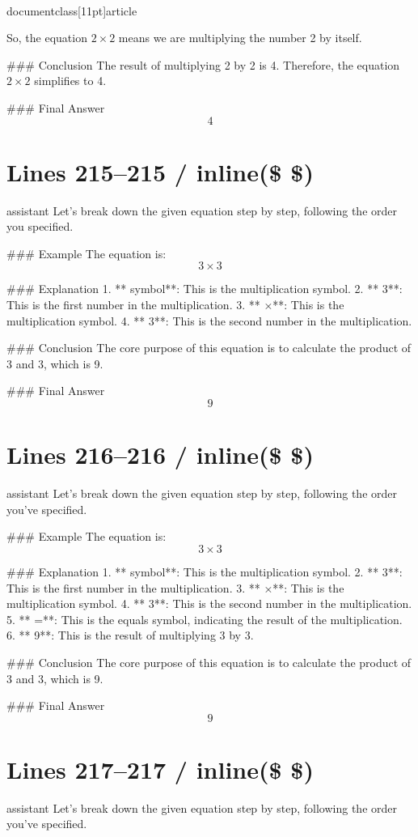 \\documentclass[11pt]{article}
\begin{document}
So, the equation \( 2 \times 2 \) means we are multiplying the number 2 by itself.

### Conclusion
The result of multiplying 2 by 2 is 4. Therefore, the equation \( 2 \times 2 \) simplifies to 4.

### Final Answer
\[
\boxed{4}
\]


\section*{Lines 215–215 / inline(\$ \$) }
assistant
Let's break down the given equation step by step, following the order you specified.

### Example
The equation is:
\[ 3 \times 3 \]

### Explanation
1. ** symbol**: This is the multiplication symbol.
2. ** 3**: This is the first number in the multiplication.
3. ** ×**: This is the multiplication symbol.
4. ** 3**: This is the second number in the multiplication.

### Conclusion
The core purpose of this equation is to calculate the product of 3 and 3, which is 9.

### Final Answer
\[
\boxed{9}
\]


\section*{Lines 216–216 / inline(\$ \$) }
assistant
Let's break down the given equation step by step, following the order you've specified.

### Example
The equation is:
\[ 3 \times 3 \]

### Explanation
1. ** symbol**: This is the multiplication symbol.
2. ** 3**: This is the first number in the multiplication.
3. ** ×**: This is the multiplication symbol.
4. ** 3**: This is the second number in the multiplication.
5. ** =**: This is the equals symbol, indicating the result of the multiplication.
6. ** 9**: This is the result of multiplying 3 by 3.

### Conclusion
The core purpose of this equation is to calculate the product of 3 and 3, which is 9.

### Final Answer
\[
\boxed{9}
\]


\section*{Lines 217–217 / inline(\$ \$) }
assistant
Let's break down the given equation step by step, following the order you've specified.
\end{document}
